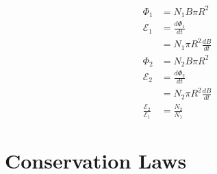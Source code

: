 \documentclass{article}
\begin{document}
\setcounter{subsection}{56}
\subsection{}

\begin{align*}
  \Phi_1                              & = N_1 B \pi R^2               \\
  \mathcal{E}_1                       & = \frac{d \Phi_1}{d t}        \\
                                      & = N_1 \pi R^2 \frac{d B}{d t} \\
  \Phi_2                              & = N_2 B \pi R^2               \\
  \mathcal{E}_2                       & = \frac{d \Phi_2}{d t}        \\
                                      & = N_2 \pi R^2 \frac{d B}{d t} \\
  \frac{\mathcal{E}_2}{\mathcal{E}_1} & = \frac{N_2}{N_1}
\end{align*}

\section{Conservation Laws}

\subsection{}
\end{document}
